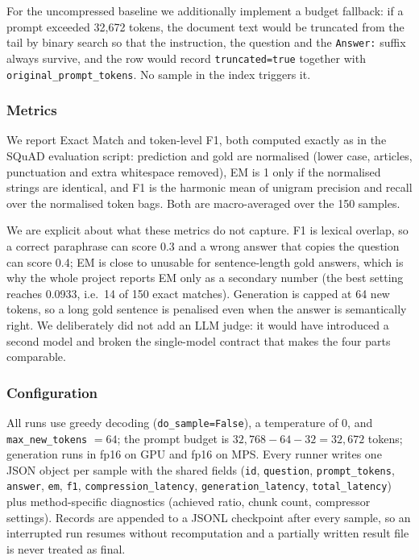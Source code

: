 \documentclass[10pt,a4paper,twocolumn]{article}
\begin{document}
For the uncompressed baseline we additionally implement a budget fallback: if a
prompt exceeded 32{,}672 tokens, the document text would be truncated from the
tail by binary search so that the instruction, the question and the
\texttt{Answer:} suffix always survive, and the row would record
\texttt{truncated=true} together with \texttt{original\_prompt\_tokens}. No sample
in the index triggers it.

\subsubsection{Metrics}

We report Exact Match and token-level F1, both computed exactly as in the SQuAD
evaluation script: prediction and gold are normalised (lower case, articles,
punctuation and extra whitespace removed), EM is 1 only if the normalised strings
are identical, and F1 is the harmonic mean of unigram precision and recall over
the normalised token bags. Both are macro-averaged over the 150 samples.

We are explicit about what these metrics do not capture. F1 is lexical overlap, so
a correct paraphrase can score 0.3 and a wrong answer that copies the question can
score 0.4; EM is close to unusable for sentence-length gold answers, which is why
the whole project reports EM only as a secondary number (the best setting reaches
0.0933, i.e.\ 14 of 150 exact matches). Generation is capped at 64 new tokens, so
a long gold sentence is penalised even when the answer is semantically right. We
deliberately did not add an LLM judge: it would have introduced a second model and
broken the single-model contract that makes the four parts comparable.

\subsubsection{Configuration}

All runs use greedy decoding (\texttt{do\_sample=False}), a temperature of 0, and
\texttt{max\_new\_tokens} $=64$; the prompt budget is
$32{,}768-64-32=32{,}672$ tokens; generation runs in fp16 on GPU and fp16 on MPS.
Every runner writes one JSON object per sample with the shared fields
(\texttt{id}, \texttt{question}, \texttt{prompt\_tokens}, \texttt{answer},
\texttt{em}, \texttt{f1}, \texttt{compression\_latency},
\texttt{generation\_latency}, \texttt{total\_latency}) plus method-specific
diagnostics (achieved ratio, chunk count, compressor settings). Records are
appended to a JSONL checkpoint after every sample, so an interrupted run resumes
without recomputation and a partially written result file is never treated as
final.
\end{document}
